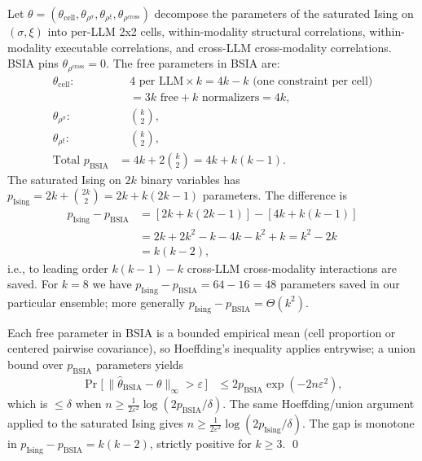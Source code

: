Let $\theta = (\theta_{\text{cell}}, \theta_{\rho^\sigma},
\theta_{\rho^\xi}, \theta_{\rho^{\text{cross}}})$ decompose the
parameters of the saturated Ising on $(\sigma, \xi)$ into per-LLM
2x2 cells, within-modality structural correlations, within-modality
executable correlations, and cross-LLM cross-modality correlations.
BSIA pins $\theta_{\rho^{\text{cross}}} = 0$.  The free parameters
in BSIA are:
\begin{align*}
  \theta_{\text{cell}}: &\quad 4 \text{ per LLM} \times k = 4k - k \text{ (one constraint per cell)} \\
                       &\quad = 3k \text{ free} + k \text{ normalizers} = 4k, \\
  \theta_{\rho^\sigma}: &\quad \binom{k}{2}, \\
  \theta_{\rho^\xi}:    &\quad \binom{k}{2}, \\
  \text{Total } p_{\text{BSIA}} &= 4k + 2\binom{k}{2} = 4k + k(k-1).
\end{align*}
The saturated Ising on $2k$ binary variables has
$p_{\text{Ising}} = 2k + \binom{2k}{2} = 2k + k(2k - 1)$ parameters.
The difference is
\begin{align*}
  p_{\text{Ising}} - p_{\text{BSIA}}
  &= [2k + k(2k-1)] - [4k + k(k-1)] \\
  &= 2k + 2k^2 - k - 4k - k^2 + k = k^2 - 2k \\
  &= k(k-2),
\end{align*}
i.e., to leading order $k(k-1) - k$ cross-LLM cross-modality
interactions are saved.  For $k = 8$ we have
$p_{\text{Ising}} - p_{\text{BSIA}} = 64 - 16 = 48$ parameters saved
in our particular ensemble; more generally
$p_{\text{Ising}} - p_{\text{BSIA}} = \Theta(k^2)$.

Each free parameter in BSIA is a bounded empirical mean (cell
proportion or centered pairwise covariance), so Hoeffding's
inequality applies entrywise; a union bound over $p_{\text{BSIA}}$
parameters yields
\begin{align*}
  \Pr\!\big[\,\|\hat\theta_{\text{BSIA}} - \theta\|_\infty > \varepsilon\,\big]
  &\leq 2 p_{\text{BSIA}} \exp(-2 n \varepsilon^2),
\end{align*}
which is $\leq \delta$ when
$n \geq \frac{1}{2 \varepsilon^2} \log(2 p_{\text{BSIA}} / \delta)$.
The same Hoeffding/union argument applied to the saturated Ising
gives $n \geq \frac{1}{2 \varepsilon^2} \log(2 p_{\text{Ising}}/\delta)$.
The gap is monotone in $p_{\text{Ising}} - p_{\text{BSIA}} = k(k-2)$,
strictly positive for $k \geq 3$. \qed
